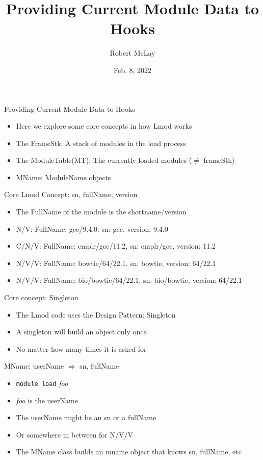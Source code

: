 \documentclass{beamer}
\begin{document}
\title[Lmod]{Providing Current Module Data to Hooks}
\author{Robert McLay} 
\date{Feb. 8, 2022}

\frame{\titlepage} 


\begin{frame}{Providing Current Module Data to Hooks}
  \begin{itemize}
    \item Here we explore some core concepts in how Lmod works
    \item The FrameStk: A stack of modules in the load process
    \item The ModuleTable(MT): The currently loaded modules
      ($\neq$ frameStk)
    \item MName: ModuleName objects
  \end{itemize}
\end{frame}


\begin{frame}{Core Lmod Concept: sn, fullName, version}
  \begin{itemize}
    \item The FullName of the module is the shortname/version
    \item N/V: FullName: gcc/9.4.0: sn: gcc, version: 9.4.0
    \item C/N/V: FullName: cmplr/gcc/11.2, sn: cmplr/gcc, version: 11.2
    \item N/V/V: FullName: bowtie/64/22.1, sn: bowtie, version: 64/22.1
    \item N/V/V: FullName: bio/bowtie/64/22.1, sn: bio/bowtie, version: 64/22.1
  \end{itemize}
\end{frame}

\begin{frame}{Core concept: Singleton}
  \begin{itemize}
    \item The Lmod code uses the Design Pattern: Singleton
    \item A singleton will build an object only once 
    \item No matter how many times it is asked for
  \end{itemize}
\end{frame}

\begin{frame}{MName: userName $\Rightarrow$ sn, fullName }
  \begin{itemize}
    \item {\color{blue}\texttt{module load} \emph{foo}}
    \item {\color{blue}\emph{foo}} is the userName
    \item The userName might be an sn or a fullName
    \item Or somewhere in between for N/V/V
    \item The MName class builds an mname object that knows sn,
      fullName, etc
  \end{itemize}
\end{frame}
\end{document}
